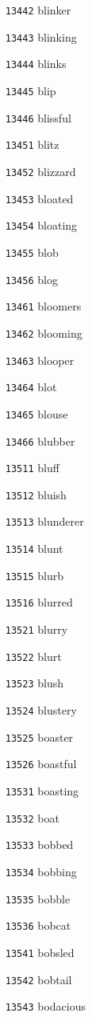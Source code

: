 \documentclass[twoside,11pt]{article}
\begin{document}
\begin{multicols}{5}
\begin{enumerate}
\item[\texttt{13442}] blinker
\item[\texttt{13443}] blinking
\item[\texttt{13444}] blinks
\item[\texttt{13445}] blip
\item[\texttt{13446}] blissful
\item[\texttt{13451}] blitz
\item[\texttt{13452}] blizzard
\item[\texttt{13453}] bloated
\item[\texttt{13454}] bloating
\item[\texttt{13455}] blob
\item[\texttt{13456}] blog
\item[\texttt{13461}] bloomers
\item[\texttt{13462}] blooming
\item[\texttt{13463}] blooper
\item[\texttt{13464}] blot
\item[\texttt{13465}] blouse
\item[\texttt{13466}] blubber
\item[\texttt{13511}] bluff
\item[\texttt{13512}] bluish
\item[\texttt{13513}] blunderer
\item[\texttt{13514}] blunt
\item[\texttt{13515}] blurb
\item[\texttt{13516}] blurred
\item[\texttt{13521}] blurry
\item[\texttt{13522}] blurt
\item[\texttt{13523}] blush
\item[\texttt{13524}] blustery
\item[\texttt{13525}] boaster
\item[\texttt{13526}] boastful
\item[\texttt{13531}] boasting
\item[\texttt{13532}] boat
\item[\texttt{13533}] bobbed
\item[\texttt{13534}] bobbing
\item[\texttt{13535}] bobble
\item[\texttt{13536}] bobcat
\item[\texttt{13541}] bobsled
\item[\texttt{13542}] bobtail
\item[\texttt{13543}] bodacious

\end{enumerate}
\end{multicols}
\end{document}
